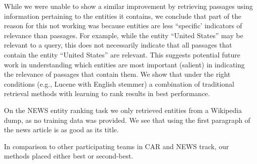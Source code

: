 \documentclass{article}
\begin{document}
While we were unable to show a similar improvement by retrieving passages using information pertaining to the entities it contains, we conclude that part of the reason for this not working was because entities are less ``specific' indicators of relevance than passages.
For example, while the entity ``United States'' may be relevant to a query, this does not necessarily indicate that all passages that contain the entity ``United States'' are relevant.
This suggests potential future work in understanding which entities are most important (salient) in indicating the relevance of passages that contain them.
 We show that under the right conditions (e.g., Lucene with English stemmer) a combination of traditional retrieval methods with learning to rank results in best performance.
 
On the NEWS entity ranking task we only retrieved entities from a Wikipedia dump, as no training data was provided. We see that using the first paragraph of the news article is as good as its title. 


 
In comparison to other participating teams in CAR and NEWS track, our methods placed either best or second-best.







\end{document}
